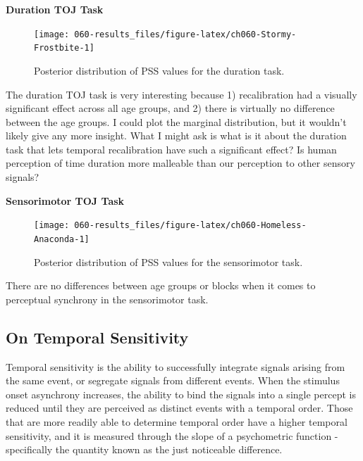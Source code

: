 \documentclass[11pt, oneside, openany]{scrbook}
\begin{document}
\textbf{Duration TOJ Task}

\begin{figure}

{\centering \texttt{[image: 060-results\_files/figure-latex/ch060-Stormy-Frostbite-1]} 

}

\caption{Posterior distribution of PSS values for the duration task.}\label{fig:ch060-Stormy-Frostbite}
\end{figure}

The duration TOJ task is very interesting because 1) recalibration had a visually significant effect across all age groups, and 2) there is virtually no difference between the age groups. I could plot the marginal distribution, but it wouldn't likely give any more insight. What I might ask is what is it about the duration task that lets temporal recalibration have such a significant effect? Is human perception of time duration more malleable than our perception to other sensory signals?

\textbf{Sensorimotor TOJ Task}

\begin{figure}

{\centering \texttt{[image: 060-results\_files/figure-latex/ch060-Homeless-Anaconda-1]} 

}

\caption{Posterior distribution of PSS values for the sensorimotor task.}\label{fig:ch060-Homeless-Anaconda}
\end{figure}

There are no differences between age groups or blocks when it comes to perceptual synchrony in the sensorimotor task.

\hypertarget{on-temporal-sensitivity}{%
\subsection{On Temporal Sensitivity}\label{on-temporal-sensitivity}}

Temporal sensitivity is the ability to successfully integrate signals arising from the same event, or segregate signals from different events. When the stimulus onset asynchrony increases, the ability to bind the signals into a single percept is reduced until they are perceived as distinct events with a temporal order. Those that are more readily able to determine temporal order have a higher temporal sensitivity, and it is measured through the slope of a psychometric function - specifically the quantity known as the just noticeable difference.
\end{document}
